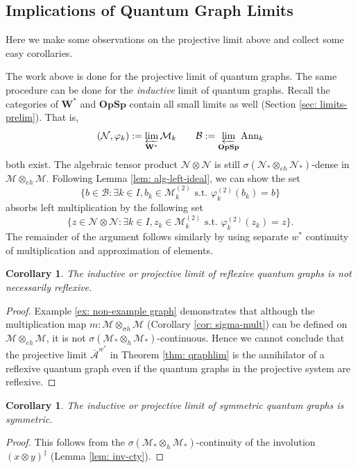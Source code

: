 \documentclass[12pt]{article}
\newtheorem{corollary}[theorem]{Corollary}
\theoremstyle{definition}
\newenvironment{remark}
  {\pushQED{\qed}\renewcommand{\qedsymbol}{\textcircled{\tiny R}}\remarkx}
  {\popQED\endremarkx}
\newcommand{\mc}[1]{\mathcal{#1}}
\newcommand{\<}{\langle}
\renewcommand{\>}{\rangle}
\newcommand{\Ann}{\text{Ann}}
\newcommand{\eh}{\otimes_{eh}}
\newcommand{\h}{\otimes_{h}}
\begin{document}
\subsection{Implications of Quantum Graph Limits}

Here we make some observations on the projective limit above and collect some easy corollaries.

\begin{remark} \label{rmk: inductive limit}
    The work above is done for the projective limit of quantum graphs. The same procedure can be done for the \textit{inductive} limit of quantum graphs. Recall the categories of ${\mathbf{W^*}}$ and ${\mathbf{OpSp}}$ contain all small limits as well (Section \ref{sec: limits-prelim}). That is, 
    \[
    (\mc N, \varphi_k) := \varprojlim_{\bf W^*} \mc M_k \qquad \mc B := \varprojlim_{\bf OpSp} \mc \Ann_k
    \]
    both exist. The algebraic tensor product $\mc N \otimes \mc N$ is still $\sigma(\mc N_* \eh \mc N_*)$-dense in $\mc M \otimes_{eh} \mc M$. Following Lemma \ref{lem: alg-left-ideal}, we can show the set
    \[
    \bigg\{b \in \mc B : \exists k \in I, b_k \in \mc M_k^{(2)}  \text{ s.t. } \varphi_{k}^{(2)}(b_k) = b\bigg\}
    \]
    absorbs left multiplication by the following set
    \[
    \bigg\{z \in \mc N \otimes \mc N : \exists k \in I, z_k \in \mc M_k^{(2)}  \text{ s.t. } \varphi_{k}^{(2)}(z_k) = z\bigg\}.
    \]
The remainder of the argument follows similarly by using separate $w^*$ continuity of multiplication and approximation of elements.
\end{remark}

\begin{corollary}
    The inductive or projective limit of reflexive quantum graphs is not necessarily reflexive. 
\end{corollary}
\begin{proof}
    Example \ref{ex: non-example graph} demonstrates that although the multiplication map $m: \mc M \otimes_{\sigma h} \mc M$ (Corollary \ref{cor: sigma-mult}) can be defined on $\mc M \eh \mc M$, it is not $\sigma(\mc M_* \h \mc M_*)$-continuous. Hence we cannot conclude that the projective limit $\overline{\mc A}^{w^*}$ in Theorem \ref{thm: qraphlim} is the annihilator of a reflexive quantum graph even if the quantum graphs in the projective system are reflexive.
\end{proof}

\begin{corollary}
    The inductive or projective limit of symmetric quantum graphs is  symmetric. 
\end{corollary}
\begin{proof}
    This follows from the $\sigma(\mc M_* \h \mc M_*)$-continuity of the involution $(x \otimes y)^\ddagger$ (Lemma  \ref{lem: inv-cty}). 
\end{proof}
\end{document}
